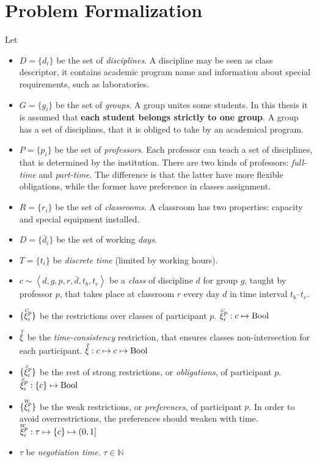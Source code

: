 \section{Problem Formalization}
\label{sec:ProblemFormal}

\def\coh{\mathrm{coh}}

\def\restrC{\accentset{C}{\xi}^p_i}
\def\restrT{\accentset{T}{\xi}}
\def\restrS{\accentset{S}{\xi}^p_i}
\def\restrW{\accentset{W}{\xi}^p_i}



Let \begin{itemize}
\item $D=\{d_i\}$ be the set of \emph{disciplines}.
  A discipline may be seen as class descriptor, it contains
  academic program name and information about special requirements,
  such as laboratories.
\item $G=\{g_i\}$ be the set of \emph{groups}.
  A group unites some students. In this thesis it is assumed that
  \textbf{each student belongs strictly to one group}.
  A group has a set of disciplines, that it is obliged to take by an
  academical program.
\item $P=\{p_i\}$ be the set of \emph{professors}.
  Each professor can teach a set of disciplines, that is determined
  by the institution. There are two kinds of professors:
  \emph{full-time} and \emph{part-time}. The difference is that the
  latter have more flexible obligations, while the former have preference
  in classes assignment.
\item $R=\{r_i\}$ be the set of \emph{classrooms}.
  A classroom has two properties: capacity and special equipment installed.
\item $D=\{\bar d_i\}$ be the set of working \emph{days}.
\item $T=\{t_i\}$ be \emph{discrete time} (limited by working hours).
\item $ c \sim \left< d, g, p, r, \bar d, t_b, t_e \right> $ be a \emph{class}
  of discipline $d$ for group $g$, taught by professor $p$, that takes place
  at classroom $r$ every day $d$ in time interval $t_b$--$t_e$.
\item $\{\restrC\}$ be the restrictions over classes of participant $p$.
      $\restrC : c \mapsto \mathrm{Bool}$
\item $\restrT$ be the \emph{time-consistency} restriction, that ensures
  classes non-intersection for each participant.
      $\restrT : c \mapsto c \mapsto \mathrm{Bool}$
\item $\{\restrS\}$ be the rest of strong restrictions, or \emph{obligations},
      of participant $p$.
      $\restrS : \{c\} \mapsto \mathrm{Bool}$
\item $\{\restrW\}$ be the weak restrictions, or \emph{preferences}, of participant $p$.
      In order to avoid overrestrictions, the preferences should weaken with time.
      $\restrW : \tau \mapsto \{c\} \mapsto (0,1]$
\item $\tau$ be \emph{negotiation time}. $\tau \in \mathbb{N}$
\end{itemize}
\medskip

